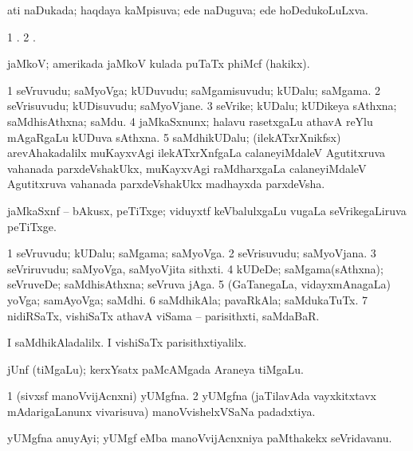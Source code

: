 \bentry
{}
\gl{\gu}
\bmng
ati naDukada; haqdaya kaMpisuva; ede naDuguva; ede hoDedukoLuLxva. 
\emng
\eentry

\bentry
{}
\pron{}
\gl{\saMkiSx}
\bmng
\bnum
\num{1} . 
\num{2} . 
\enum
\emng
\eentry

\bentry
{}
\gl{\nA}
\bmng
jaMkoV; amerikada jaMkoV kulada puTaTx phiMcf (hakikx). 
\emng
\eentry


\bentry
{}
\gl{\nA}
\bmng
\bnum
\num{1} seVruvudu; saMyoVga; kUDuvudu; saMgamisuvudu; kUDalu; saMgama. 
\num{2} seVrisuvudu; kUDisuvudu; saMyoVjane. 
\num{3} seVrike; kUDalu; kUDikeya sAthxna; saMdhisAthxna; saMdu. 
\num{4} jaMkaSxnunx; halavu rasetxgaLu athavA reYlu mAgaRgaLu kUDuva sAthxna. 
\num{5} saMdhikUDalu; (ilekATxrXnikfsx) arevAhakadalilx muKayxvAgi ilekATxrXnfgaLa calaneyiMdaleV Agutitxruva vahanada parxdeVshakUkx, muKayxvAgi raMdharxgaLa calaneyiMdaleV Agutitxruva vahanada parxdeVshakUkx madhayxda parxdeVsha. 
\enum
\emng
\eentry

\bentry
{}
\gl{\nA}
\bmng
jaMkaSxnf -- bAkusx, peTiTxge; viduyxtf keVbalulxgaLu \mo vugaLa seVrikegaLiruva peTiTxge. 
\emng
\eentry


\bentry
{}
\gl{\nA}
\bmng
\bnum
\num{1} seVruvudu; kUDalu; saMgama; saMyoVga. 
\num{2} seVrisuvudu; saMyoVjana. 
\num{3} seVriruvudu; saMyoVga, saMyoVjita sithxti. 
\num{4} kUDeDe; saMgama(sAthxna); seVruveDe; saMdhisAthxna; seVruva jAga. 
\num{5} (GaTanegaLa, vidayxmAnagaLa) yoVga; samAyoVga; saMdhi. 
\num{6} saMdhikAla; pavaRkAla; saMdukaTuTx. 
\num{7} nidiRSaTx, vishiSaTx athavA viSama -- parisithxti, saMdaBaR. 
\enum
\emng

\noindent
\gl{\pagu}
\bmng
{} 
\banum
{} I saMdhikAladalilx. 
 I vishiSaTx parisithxtiyalilx. 
\eanum
\emng
\eentry

\bentry
{}
\gl{\nA}
\bmng
jUnf (tiMgaLu); kerxYsatx paMcAMgada Araneya tiMgaLu. 
\emng
\eentry


\bentry
{}
\gl{\gu}
\bmng
\bnum
\num{1} (sivxsf manoVvijAcnxni) yUMgfna. 
\num{2} yUMgfna (jaTilavAda vayxkitxtavx mAdarigaLanunx vivarisuva) manoVvishelxVSaNa padadxtiya. 
\enum
\emng
\eentry

\bentry
{}
\gl{\nA}
\bmng
yUMgfna anuyAyi; yUMgf eMba manoVvijAcnxniya paMthakekx seVridavanu. 
\emng
\eentry

